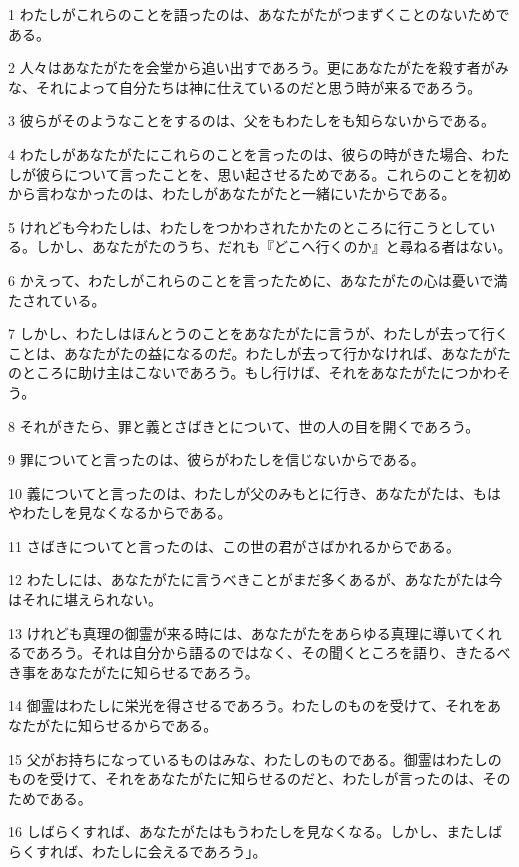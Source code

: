 \par 1 わたしがこれらのことを語ったのは、あなたがたがつまずくことのないためである。
\par 2 人々はあなたがたを会堂から追い出すであろう。更にあなたがたを殺す者がみな、それによって自分たちは神に仕えているのだと思う時が来るであろう。
\par 3 彼らがそのようなことをするのは、父をもわたしをも知らないからである。
\par 4 わたしがあなたがたにこれらのことを言ったのは、彼らの時がきた場合、わたしが彼らについて言ったことを、思い起させるためである。これらのことを初めから言わなかったのは、わたしがあなたがたと一緒にいたからである。
\par 5 けれども今わたしは、わたしをつかわされたかたのところに行こうとしている。しかし、あなたがたのうち、だれも『どこへ行くのか』と尋ねる者はない。
\par 6 かえって、わたしがこれらのことを言ったために、あなたがたの心は憂いで満たされている。
\par 7 しかし、わたしはほんとうのことをあなたがたに言うが、わたしが去って行くことは、あなたがたの益になるのだ。わたしが去って行かなければ、あなたがたのところに助け主はこないであろう。もし行けば、それをあなたがたにつかわそう。
\par 8 それがきたら、罪と義とさばきとについて、世の人の目を開くであろう。
\par 9 罪についてと言ったのは、彼らがわたしを信じないからである。
\par 10 義についてと言ったのは、わたしが父のみもとに行き、あなたがたは、もはやわたしを見なくなるからである。
\par 11 さばきについてと言ったのは、この世の君がさばかれるからである。
\par 12 わたしには、あなたがたに言うべきことがまだ多くあるが、あなたがたは今はそれに堪えられない。
\par 13 けれども真理の御霊が来る時には、あなたがたをあらゆる真理に導いてくれるであろう。それは自分から語るのではなく、その聞くところを語り、きたるべき事をあなたがたに知らせるであろう。
\par 14 御霊はわたしに栄光を得させるであろう。わたしのものを受けて、それをあなたがたに知らせるからである。
\par 15 父がお持ちになっているものはみな、わたしのものである。御霊はわたしのものを受けて、それをあなたがたに知らせるのだと、わたしが言ったのは、そのためである。
\par 16 しばらくすれば、あなたがたはもうわたしを見なくなる。しかし、またしばらくすれば、わたしに会えるであろう」。
